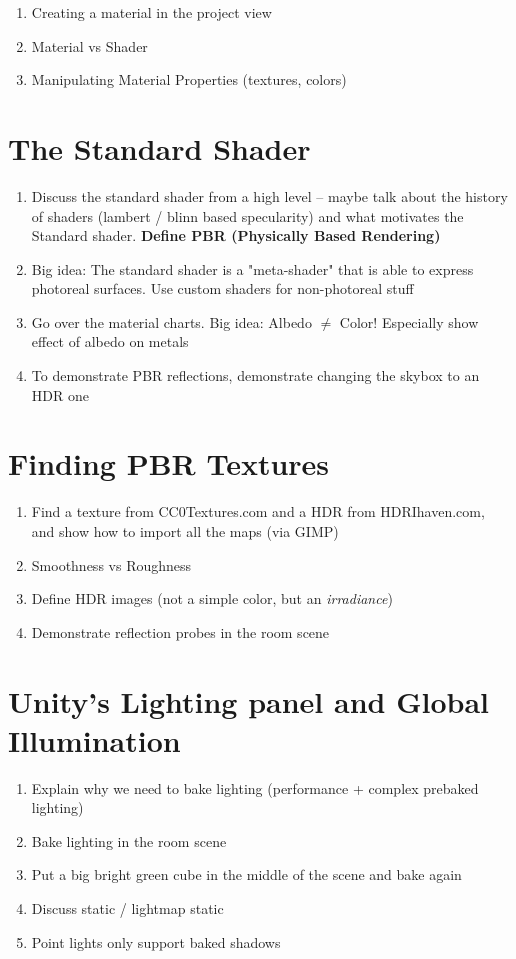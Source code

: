 \documentclass[11pt]{article}
\begin{document}
\begin{enumerate}
	\item Creating a material in the project view
	\item Material vs Shader
	\item Manipulating Material Properties (textures, colors)
\end{enumerate}

\section{The Standard Shader}

\begin{enumerate}
	\item Discuss the standard shader from a high level -- maybe talk about the history of shaders (lambert / blinn based specularity) and what motivates the Standard shader.  \textbf{Define PBR (Physically Based Rendering)}
	\item Big idea: The standard shader is a "meta-shader" that is able to express photoreal surfaces.  Use custom shaders for non-photoreal stuff
	\item Go over the material charts.  Big idea: Albedo $\neq$ Color!  Especially show effect of albedo on metals
	\item To demonstrate PBR reflections, demonstrate changing the skybox to an HDR one
\end{enumerate}

\section{Finding PBR Textures}

\begin{enumerate}
	\item Find a texture from CC0Textures.com and a HDR from HDRIhaven.com, and show how to import all the maps (via GIMP)
	\item Smoothness vs Roughness
	\item Define HDR images (not a simple color, but an \textit{irradiance})
	\item Demonstrate reflection probes in the room scene
\end{enumerate}

\section{Unity's Lighting panel and Global Illumination}

\begin{enumerate}
	\item Explain why we need to bake lighting (performance + complex prebaked lighting)
	\item Bake lighting in the room scene
	\item Put a big bright green cube in the middle of the scene and bake again
	\item Discuss static / lightmap static
	\item Point lights only support baked shadows
\end{enumerate}
\end{document}
